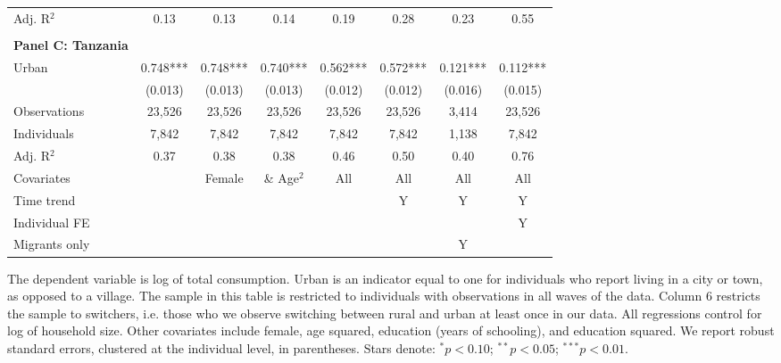 \begin{table}[htbp]
\begin{threeparttable}
\begin{tabular}{l ccccccc}
Adj. R$^{2}$        &        0.13   &        0.13   &        0.14   &        0.19   &        0.28   &        0.23   &        0.55   \\
\cmidrule{2-8}
                    &               &               &               &               &               &               &               \\
\textbf{Panel C: Tanzania} \\
Urban               &       0.748***&       0.748***&       0.740***&       0.562***&       0.572***&       0.121***&       0.112***\\
                    &     (0.013)   &     (0.013)   &     (0.013)   &     (0.012)   &     (0.012)   &     (0.016)   &     (0.015)   \\
\addlinespace
Observations        &      23,526   &      23,526   &      23,526   &      23,526   &      23,526   &       3,414   &      23,526   \\
Individuals         &       7,842   &       7,842   &       7,842   &       7,842   &       7,842   &       1,138   &       7,842   \\
Adj. R$^{2}$        &        0.37   &        0.38   &        0.38   &        0.46   &        0.50   &        0.40   &        0.76   \\
\cmidrule{2-8} Covariates & & Female & \& Age$^2$ & All & All & All & All  \\ Time trend & & & & & Y & Y & Y  \\ Individual FE & & & & & & & Y  \\ Migrants only & & & & & & Y &  \\ \bottomrule \end{tabular} \begin{tablenotes}[flushleft] \footnotesize \item{The dependent variable is log of total consumption. Urban is an indicator equal to one for individuals who report living in a city or town, as opposed to a village. The sample in this table is restricted to individuals with observations in all waves of the data. Column 6 restricts the sample to switchers, i.e. those who we observe switching between rural and urban at least once in our data. All regressions control for log of household size. Other covariates include female, age squared, education (years of schooling), and education squared. We report robust standard errors, clustered at the individual level, in parentheses. Stars denote: $^{*} p<0.10$; $^{**} p<0.05$; $^{***} p<0.01$.} \end{tablenotes} \end{threeparttable} \end{table}
